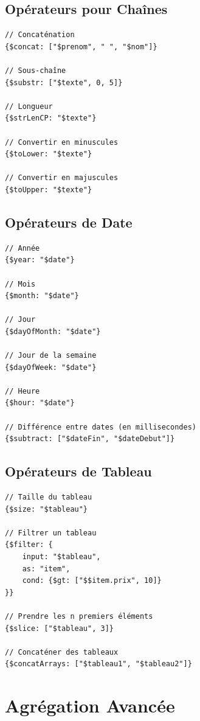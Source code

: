 \documentclass[11pt,a4paper]{article}
\begin{document}
\subsection{Opérateurs pour Chaînes}

\begin{lstlisting}
// Concaténation
{$concat: ["$prenom", " ", "$nom"]}

// Sous-chaîne
{$substr: ["$texte", 0, 5]}

// Longueur
{$strLenCP: "$texte"}

// Convertir en minuscules
{$toLower: "$texte"}

// Convertir en majuscules
{$toUpper: "$texte"}
\end{lstlisting}

\subsection{Opérateurs de Date}

\begin{lstlisting}
// Année
{$year: "$date"}

// Mois
{$month: "$date"}

// Jour
{$dayOfMonth: "$date"}

// Jour de la semaine
{$dayOfWeek: "$date"}

// Heure
{$hour: "$date"}

// Différence entre dates (en millisecondes)
{$subtract: ["$dateFin", "$dateDebut"]}
\end{lstlisting}

\subsection{Opérateurs de Tableau}

\begin{lstlisting}
// Taille du tableau
{$size: "$tableau"}

// Filtrer un tableau
{$filter: {
    input: "$tableau",
    as: "item",
    cond: {$gt: ["$$item.prix", 10]}
}}

// Prendre les n premiers éléments
{$slice: ["$tableau", 3]}

// Concaténer des tableaux
{$concatArrays: ["$tableau1", "$tableau2"]}
\end{lstlisting}

\newpage

\section{Agrégation Avancée}
\end{document}
